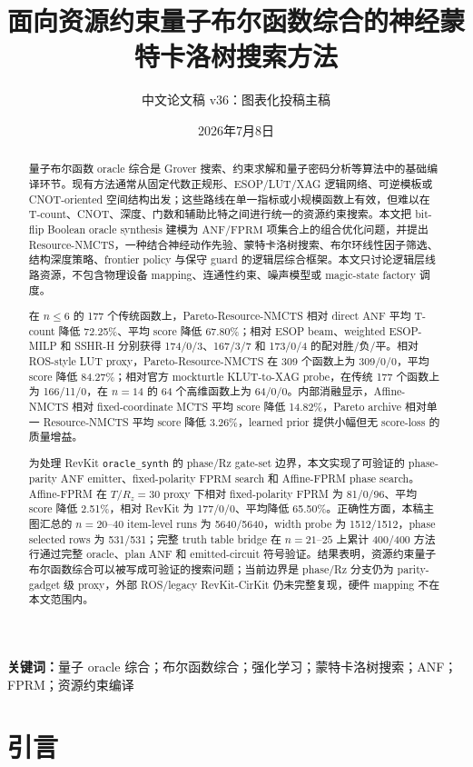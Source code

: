 \documentclass[UTF8,fontset=macnew,11pt]{ctexart}
\title{面向资源约束量子布尔函数综合的神经蒙特卡洛树搜索方法}
\author{中文论文稿 v36：图表化投稿主稿}
\date{2026年7月8日}
\newcommand{\method}{Resource-NMCTS}
\newcommand{\anf}{\ensuremath{\mathrm{ANF}}}
\newcommand{\fprm}{\ensuremath{\mathrm{FPRM}}}
\newcommand{\ttable}{truth table}
\begin{document}
\pagestyle{plain}
\maketitle

\begin{abstract}
量子布尔函数 oracle 综合是 Grover 搜索、约束求解和量子密码分析等算法中的基础编译环节。现有方法通常从固定代数正规形、ESOP/LUT/XAG 逻辑网络、可逆模板或 CNOT-oriented 空间结构出发；这些路线在单一指标或小规模函数上有效，但难以在 T-count、CNOT、深度、门数和辅助比特之间进行统一的资源约束搜索。本文把 bit-flip Boolean oracle synthesis 建模为 \anf{}/\fprm{} 项集合上的组合优化问题，并提出 \method{}，一种结合神经动作先验、蒙特卡洛树搜索、布尔环线性因子筛选、结构深度策略、frontier policy 与保守 guard 的逻辑层综合框架。本文只讨论逻辑层线路资源，不包含物理设备 mapping、连通性约束、噪声模型或 magic-state factory 调度。

在 $n\leq6$ 的 177 个传统函数上，Pareto-\method{} 相对 direct \anf{} 平均 T-count 降低 72.25\%、平均 score 降低 67.80\%；相对 ESOP beam、weighted ESOP-MILP 和 SSHR-H 分别获得 174/0/3、167/3/7 和 173/0/4 的配对胜/负/平。相对 ROS-style LUT proxy，Pareto-\method{} 在 309 个函数上为 309/0/0，平均 score 降低 84.27\%；相对官方 mockturtle KLUT-to-XAG probe，在传统 177 个函数上为 166/11/0，在 $n=14$ 的 64 个高维函数上为 64/0/0。内部消融显示，Affine-NMCTS 相对 fixed-coordinate MCTS 平均 score 降低 14.82\%，Pareto archive 相对单一 \method{} 平均 score 降低 3.26\%，learned prior 提供小幅但无 score-loss 的质量增益。

为处理 RevKit \texttt{oracle\_synth} 的 phase/Rz gate-set 边界，本文实现了可验证的 phase-parity \anf{} emitter、fixed-polarity \fprm{} search 和 Affine-FPRM phase search。Affine-FPRM 在 $T/R_z=30$ proxy 下相对 fixed-polarity FPRM 为 81/0/96、平均 score 降低 2.51\%，相对 RevKit 为 177/0/0、平均降低 65.50\%。正确性方面，本稿主图汇总的 $n=20$--$40$ item-level runs 为 5640/5640，width probe 为 1512/1512，phase selected rows 为 531/531；完整 \ttable{} bridge 在 $n=21$--$25$ 上累计 400/400 方法行通过完整 oracle、plan \anf{} 和 emitted-circuit 符号验证。结果表明，资源约束量子布尔函数综合可以被写成可验证的搜索问题；当前边界是 phase/Rz 分支仍为 parity-gadget 级 proxy，外部 ROS/legacy RevKit-CirKit 仍未完整复现，硬件 mapping 不在本文范围内。
\end{abstract}

\noindent\textbf{关键词：}量子 oracle 综合；布尔函数综合；强化学习；蒙特卡洛树搜索；ANF；FPRM；资源约束编译

\section{引言}
\end{document}
